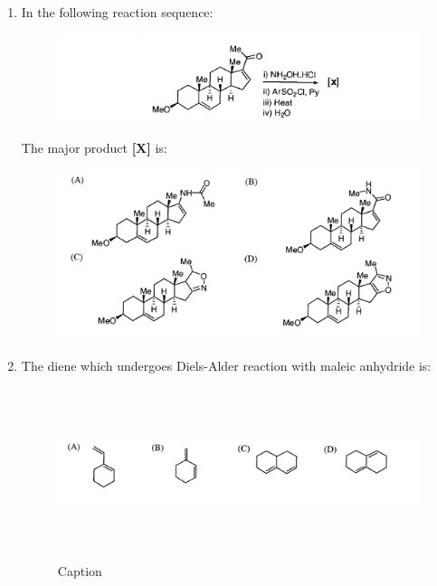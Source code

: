\documentclass[journal,12pt,onecolumn]{IEEEtran}
\theoremstyle{remark}
\begin{document}
\begin{enumerate}
\item    In the following reaction sequence: \hfill{}
 


\begin{figure}
    \centering
    \includegraphics[width=0.5\columnwidth]{figs/image4.png}
    \caption{}
    \label{fig:figure4}
\end{figure}



\noindent The major product \textbf{[X]} is:
  
\begin{figure}
    \centering
    \includegraphics[scale=0.75]{figs/image5.png}
    \caption{}
    \label{fig:figure5}
\end{figure}


 


\item    The diene which undergoes Diels-Alder reaction with maleic anhydride is:  \hfill{}
 \begin{figure}
     \centering
     \includegraphics[height=5cm,width=18cm]{figs/image6.png}
     \caption{Caption}
     \label{fig:placeholder}
 \end{figure}


\end{enumerate}
\end{document}
